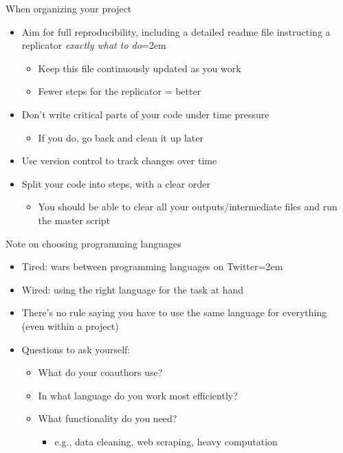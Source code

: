 \documentclass{beamer}
\begin{document}
\begin{frame}{When organizing your project}
    \begin{itemize}
        \item Aim for full reproducibility, including a detailed readme file instructing a replicator \textit{exactly what to do}\itemsep=2em
        \begin{itemize}
            \item Keep this file continuously updated as you work
            \item Fewer steps for the replicator = better
        \end{itemize}
        \item<2-> Don't write critical parts of your code under time pressure
        \begin{itemize}
            \item If you do, go back and clean it up later
        \end{itemize}
        \item<3-> Use version control to track changes over time
        \item<4-> Split your code into steps, with a clear order
        \begin{itemize}
            \item You should be able to clear all your outputs/intermediate files and run the master script
        \end{itemize}
    \end{itemize}
\end{frame}

\begin{frame}{Note on choosing programming languages}
    \begin{itemize}
        \item Tired: wars between programming languages on Twitter\itemsep=2em
        \item Wired: using the right language for the task at hand
        \item There's no rule saying you have to use the same language for everything (even within a project)
        \item<2-> Questions to ask yourself:
        \begin{itemize}
            \item What do your coauthors use?
            \item In what language do you work most efficiently?
            \item What functionality do you need?
            \begin{itemize}
                \item e.g., data cleaning, web scraping, heavy computation
            \end{itemize}
        \end{itemize}
    \end{itemize}
\end{frame}
\end{document}
